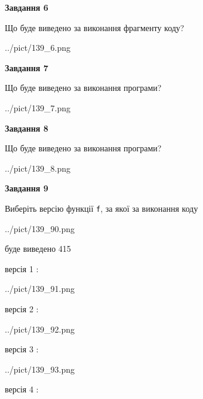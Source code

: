 \documentclass[12pt, ukrainian]{article}
\def\code#1{\Verb!#1!}
\begin{document}
{\begin {large}
{\begin {center}\textbf{Завдання 6}\end {center}}

Що буде виведено за виконання фрагменту коду?\par
\begin{center}
	{../pict/139_6.png}
\end{center}
\newpage

{\begin {center}\textbf{Завдання 7}\end {center}}

Що буде виведено за виконання програми?\par
\begin{center}
	{../pict/139_7.png}
\end{center}
\newpage

{\begin {center}\textbf{Завдання 8}\end {center}}

Що буде виведено за виконання програми?\par
\begin{center}
	{../pict/139_8.png}
\end{center}
\newpage

{\begin {center}\textbf{Завдання 9}\end {center}}

Виберіть версію функції \code{f}, за якої за виконання коду
\begin{center}
	{../pict/139_90.png}
\end{center}
буде виведено 415

\vspace{5mm}
версія 1 :

\begin{center}
	{../pict/139_91.png}
\end{center}
версія 2 :

\begin{center}
	{../pict/139_92.png}
\end{center}
версія 3 :

\begin{center}
	{../pict/139_93.png}
\end{center}
версія 4 :


\end{large}}
\end{document}
